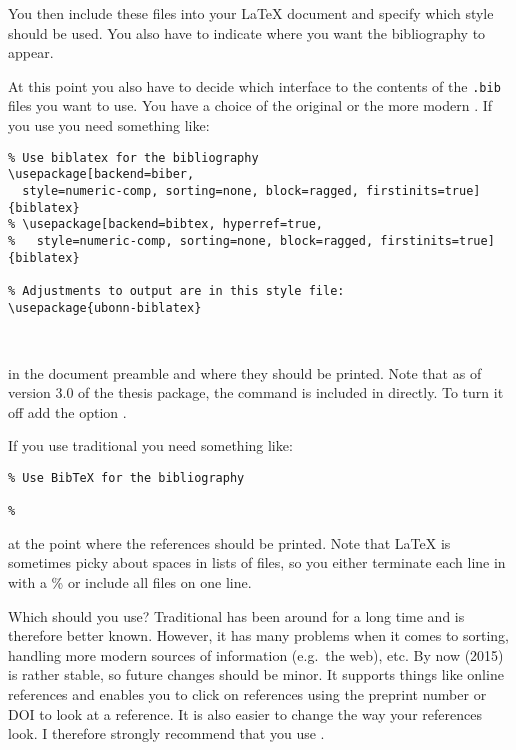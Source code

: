 You then include these files into your \LaTeX{} document and
specify which style should be used.
You also have to indicate where you want the bibliography to appear.

At this point you also have to decide which interface to the contents
of the \texttt{.bib} files you want to use. You have a choice of the
original \BibTeX{} or the more modern
. If you use  you
need something like:
\begin{verbatim}
% Use biblatex for the bibliography
\usepackage[backend=biber,
  style=numeric-comp, sorting=none, block=ragged, firstinits=true]{biblatex}
% \usepackage[backend=bibtex, hyperref=true,
%   style=numeric-comp, sorting=none, block=ragged, firstinits=true]{biblatex}

% Adjustments to output are in this style file:
\usepackage{ubonn-biblatex}



\end{verbatim}
in the document preamble and  where they
should be printed.
Note that as of version 3.0 of the thesis package,
the  command is included in  directly.
To turn it off add the option .
\par\noindent
If you use traditional \BibTeX{} you need something like:
\begin{verbatim}
% Use BibTeX for the bibliography

% 

\end{verbatim}
at the point where the references should be printed.
Note that \LaTeX{} is sometimes picky about spaces in lists of files,
so you either terminate each line in  with a \% or include all files on one line.

Which should you use? Traditional \BibTeX{} has been around for a long time and is
therefore better known. However, it has many problems when it comes to
sorting, handling more modern sources of information (e.g.\ the web),
etc. 
By now (2015)  is rather stable,
so future changes should be minor.
It supports things like online references and enables you to click on references
using the preprint number or DOI to look at a reference. It is also
easier to change the way your references look. I therefore
strongly recommend that you use .

